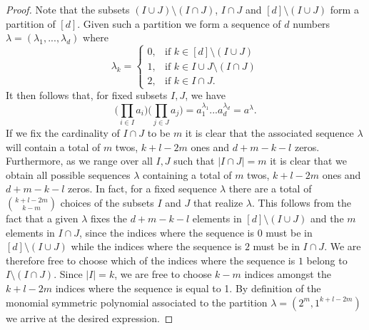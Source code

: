 \documentclass[11pt, a4paper, oneside, reqno]{amsart}
\theoremstyle{remark}
\theoremstyle{definition}
\numberwithin{equation}{section}
\begin{document}
\begin{proof}
    Note that the subsets $(I \cup J) \setminus (I\cap J)$, $I \cap J$ and $[d] \setminus (I \cup J)$ form a partition of $[d]$. Given such a partition we form a sequence of $d$ numbers $\lambda = (\lambda_1,...,\lambda_d)$ where 
$$
\lambda_k = \begin{cases}
0, & \text{if $k \in [d]\setminus (I\cup J)$} \\
1, & \text{if $k \in I \cup J \setminus (I\cap J)$} \\
2, &  \text{if $k \in I \cap J$}.
\end{cases}
$$
It then follows that, for fixed subsets $I,J$, we have 
$$
\Big(\prod_{i\in I} a_i\Big)
       \Big(\prod_{j\in J} a_j\Big) = a_1^{\lambda_1}...a_d^{\lambda_d} = a^\lambda.
$$
If we fix the cardinality of $I \cap J$ to be $m$ it is clear that the associated sequence $\lambda$ will contain a total of $m$ twos, $k+l-2m$ ones and $d+m-k-l$ zeros. Furthermore, as we range over all $I, J$ such that $|I \cap J | = m$ it is clear that we obtain all possible sequences $\lambda$ containing a total of $m$ twos, $k+l-2m$ ones and $d+m-k-l$ zeros. In fact, for a fixed sequence $\lambda$ there are a total of $\binom{k+l-2m}{k-m}$ choices of the subsets $I$ and $J$ that realize $\lambda$. This follows from the fact that a given $\lambda$ fixes the $d+m-k-l$ elements in $[d]\setminus (I \cup J)$ and the $m$ elements in $I \cap J$, since the indices where the sequence is 0 must be in $[d]\setminus (I \cup J)$ while the indices where the sequence is $2$ must be in $I \cap J$. We are therefore free to choose which of the indices where the sequence is $1$ belong to $I \setminus (I \cap J)$. Since $|I|=k$, we are free to choose $k-m$ indices amongst the $k+l-2m$ indices where the sequence is equal to 1. By definition of the monomial symmetric polynomial associated to the partition $\lambda = (2^m,1^{k+l-2m})$ we arrive at the desired expression.
\end{proof}
\end{document}
